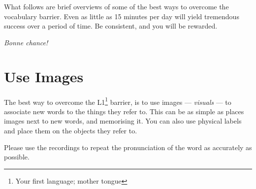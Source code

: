 \documentclass[letterpaper,twoside,openright,11pt,final]{memoir}
\begin{document}
What follows are brief overviews of some of the best ways to overcome the vocabulary barrier. Even as little as 15 minutes per day will yield tremendous success over a period of time. Be consistent, and you will be rewarded.

\textit{Bonne chance!}

\section{Use Images}

The best way to overcome the L1\footnote{Your first language; mother tongue} barrier, is to use images --- \textit{visuals} --- to associate new words to the things they refer to. This can be as simple as places images next to new words, and memorising it. You can also use physical labels and place them on the objects they refer to. 

Please use the recordings to repeat the pronunciation of the word as accurately as possible.
\end{document}

